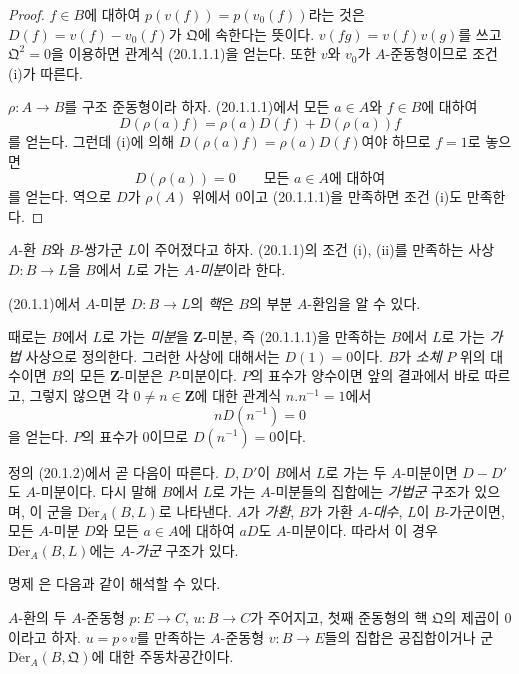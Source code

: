 \begin{proof}
$f\in B$에 대하여 $p(v(f))=p(v_0(f))$라는 것은
$D(f)=v(f)-v_0(f)$가 $\mathfrak Q$에 속한다는 뜻이다.
$v(fg)=v(f)v(g)$를 쓰고 $\mathfrak Q^2=0$을 이용하면 관계식
(20.1.1.1)을 얻는다. 또한 $v$와 $v_0$가 $A$-준동형이므로 조건 (i)가
따른다.

$\rho:A\to B$를 구조 준동형이라 하자. (20.1.1.1)에서 모든
$a\in A$와 $f\in B$에 대하여
\[
  D(\rho(a)f)=\rho(a)D(f)+D(\rho(a))f
\]
를 얻는다. 그런데 (i)에 의해 $D(\rho(a)f)=\rho(a)D(f)$여야 하므로
$f=1$로 놓으면
\[
  D(\rho(a))=0\qquad\text{모든 $a\in A$에 대하여}
\]
를 얻는다. 역으로 $D$가 $\rho(A)$ 위에서 $0$이고 (20.1.1.1)을
만족하면 조건 (i)도 만족한다.
\end{proof}

\begin{definition}[20.1.2]
\label{0.20.1.2-ko}
$A$-환 $B$와 $B$-쌍가군 $L$이 주어졌다고 하자. (20.1.1)의 조건
(i), (ii)를 만족하는 사상 $D:B\to L$을 $B$에서 $L$로 가는
\emph{$A$-미분}이라 한다.
\end{definition}

(20.1.1)에서 $A$-미분 $D:B\to L$의 \emph{핵}은 $B$의 부분
$A$-환임을 알 수 있다.

때로는 $B$에서 $L$로 가는 \emph{미분}을 $\mathbf Z$-미분, 즉
(20.1.1.1)을 만족하는 $B$에서 $L$로 가는 \emph{가법} 사상으로
정의한다. 그러한 사상에 대해서는 $D(1)=0$이다. $B$가 \emph{소체}
$P$ 위의 대수이면 $B$의 모든 $\mathbf Z$-미분은 $P$-미분이다.
$P$의 표수가 양수이면 앞의 결과에서 바로 따르고, 그렇지 않으면
각 $0\neq n\in\mathbf Z$에 대한 관계식 $n.n^{-1}=1$에서
\[
  nD(n^{-1})=0
\]
을 얻는다. $P$의 표수가 $0$이므로 $D(n^{-1})=0$이다.

정의 (20.1.2)에서 곧 다음이 따른다. $D,D'$이 $B$에서 $L$로 가는
두 $A$-미분이면 $D-D'$도 $A$-미분이다. 다시 말해 $B$에서 $L$로
가는 $A$-미분들의 집합에는 \emph{가법군} 구조가 있으며, 이 군을
$\operatorname{D\acute{e}r}_A(B,L)$로 나타낸다. $A$가 \emph{가환},
$B$가 가환 $A$-\emph{대수}, $L$이 $B$-가군이면, 모든 $A$-미분
$D$와 모든 $a\in A$에 대하여 $aD$도 $A$-미분이다. 따라서 이 경우
$\operatorname{D\acute{e}r}_A(B,L)$에는 $A$-\emph{가군} 구조가 있다.

명제 은 다음과 같이 해석할 수 있다.

\begin{corollary}[20.1.3]
\label{0.20.1.3-ko}
$A$-환의 두 $A$-준동형 $p:E\to C$, $u:B\to C$가 주어지고, 첫째
준동형의 핵 $\mathfrak Q$의 제곱이 $0$이라고 하자. $u=p\circ v$를
만족하는 $A$-준동형 $v:B\to E$들의 집합은 공집합이거나 군
$\operatorname{D\acute{e}r}_A(B,\mathfrak Q)$에 대한 주동차공간이다.
\end{corollary}

